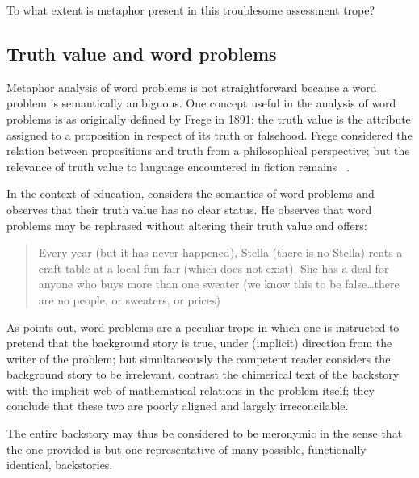 To what extent is metaphor present in this troublesome assessment
trope?

\subsection{Truth value and word problems}

Metaphor analysis of word problems is not straightforward because a
word problem is semantically ambiguous.  One concept useful in the
analysis of word problems is  as originally
defined by Frege in 1891: the truth value is the attribute assigned to
a proposition in respect of its truth or falsehood.  Frege considered
the relation between propositions and truth from a philosophical
perspective; but the relevance of truth value to language encountered
in fiction remains ~\citep{lamarque1994}.

In the context of education,  considers the
semantics of word problems and observes that their truth value has no
clear status.  He observes that word problems may be rephrased without
altering their truth value and offers:

\begin{singlespace}
\begin{quote}
Every year (but it has never happened), Stella (there is no Stella)
rents a craft table at a local fun fair (which does not exist). She
has a deal for anyone who buys more than one sweater (we know this to
be false\ldots there are no people, or sweaters, or prices)
\end{quote}
\end{singlespace}

\noindent As  points out, word problems are a
peculiar trope in which one is instructed to pretend that the
background story is true, under (implicit) direction from the writer
of the problem; but simultaneously the competent reader considers the
background story to be irrelevant.   contrast the
chimerical text of the backstory with the implicit web of mathematical
relations in the problem itself; they conclude that these two
 are poorly aligned and largely
irreconcilable.

The entire backstory may thus be considered to be meronymic in the
sense that the one provided is but one representative of many
possible, functionally identical, backstories.


